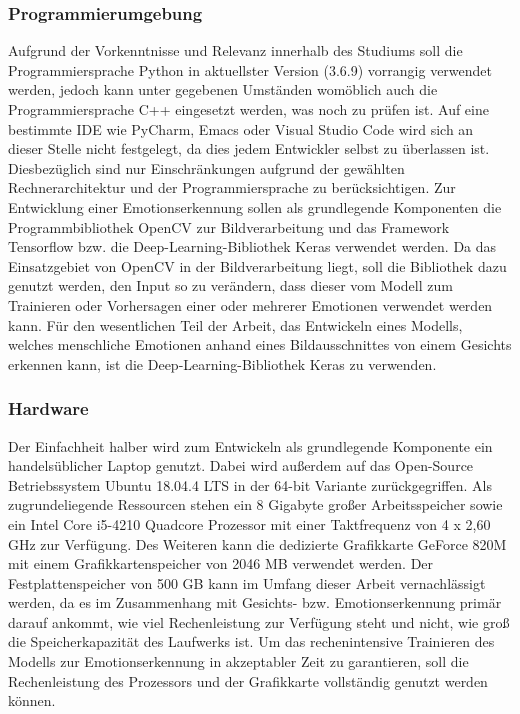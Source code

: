 \documentclass[12pt, a4paper]{report}
\begin{document}
\subsubsection{Programmierumgebung}
Aufgrund der Vorkenntnisse und Relevanz innerhalb des Studiums soll die Programmiersprache Python in aktuellster Version (3.6.9) vorrangig verwendet werden, jedoch kann unter gegebenen Umständen womöblich auch die Programmiersprache C++ eingesetzt werden, was noch zu prüfen ist. Auf eine bestimmte IDE wie PyCharm, Emacs oder Visual Studio Code wird sich an dieser Stelle nicht festgelegt, da dies jedem Entwickler selbst zu überlassen ist. Diesbezüglich sind nur Einschränkungen aufgrund der gewählten Rechnerarchitektur und der Programmiersprache zu berücksichtigen.\newline
Zur Entwicklung einer Emotionserkennung sollen als grundlegende Komponenten die Programmbibliothek OpenCV zur Bildverarbeitung und das Framework Tensorflow bzw. die Deep-Learning-Bibliothek Keras verwendet werden. Da das Einsatzgebiet von OpenCV in der Bildverarbeitung liegt, soll die Bibliothek dazu genutzt werden, den Input so zu verändern, dass dieser vom Modell zum Trainieren oder Vorhersagen einer oder mehrerer Emotionen verwendet werden kann. Für den wesentlichen Teil der Arbeit, das Entwickeln eines Modells, welches menschliche Emotionen anhand eines Bildausschnittes von einem Gesichts erkennen kann, ist die Deep-Learning-Bibliothek Keras zu verwenden.

\subsubsection{Hardware}
Der Einfachheit halber wird zum Entwickeln als grundlegende Komponente ein handelsüblicher Laptop genutzt. Dabei wird außerdem auf das Open-Source Betriebssystem Ubuntu 18.04.4 LTS in der 64-bit Variante zurückgegriffen. Als zugrundeliegende Ressourcen stehen ein 8 Gigabyte großer Arbeitsspeicher sowie ein Intel Core i5-4210 Quadcore Prozessor mit einer Taktfrequenz von 4 x 2,60 GHz zur Verfügung. Des Weiteren kann die dedizierte Grafikkarte GeForce 820M mit einem Grafikkartenspeicher von 2046 MB verwendet werden. Der Festplattenspeicher von 500 GB kann im Umfang dieser Arbeit vernachlässigt werden, da es im Zusammenhang mit Gesichts- bzw. Emotionserkennung primär darauf ankommt, wie viel Rechenleistung zur Verfügung steht und nicht, wie groß die Speicherkapazität des Laufwerks ist. Um das rechenintensive Trainieren des Modells zur Emotionserkennung in akzeptabler Zeit zu garantieren, soll die Rechenleistung des Prozessors und der Grafikkarte vollständig genutzt werden können.
\end{document}
